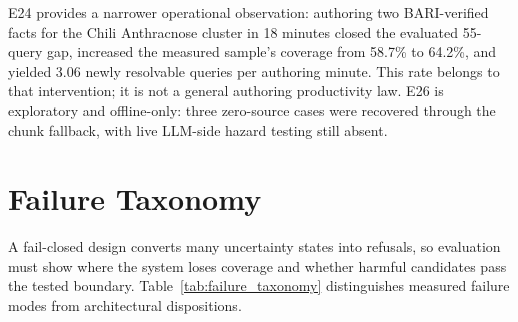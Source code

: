 \documentclass[11pt,a4paper]{article}
\begin{document}
E24 provides a narrower operational observation: authoring two BARI-verified facts for the Chili Anthracnose cluster in 18 minutes closed the evaluated 55-query gap, increased the measured sample's coverage from 58.7\% to 64.2\%, and yielded 3.06 newly resolvable queries per authoring minute. This rate belongs to that intervention; it is not a general authoring productivity law. E26 is exploratory and offline-only: three zero-source cases were recovered through the chunk fallback, with live LLM-side hazard testing still absent.


\section{Failure Taxonomy}
\label{sec:failure_taxonomy}

A fail-closed design converts many uncertainty states into refusals, so evaluation must show where the system loses coverage and whether harmful candidates pass the tested boundary. Table~\ref{tab:failure_taxonomy} distinguishes measured failure modes from architectural dispositions.
\end{document}
